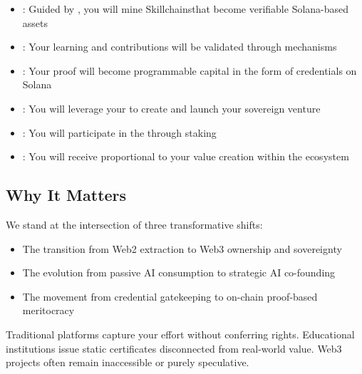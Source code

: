 \begin{itemize}
    \item {}: Guided by , you will mine Skillchains\texttrademark that become verifiable Solana-based assets
    
    \item {}: Your learning and contributions will be validated through  mechanisms
    
    \item {}: Your proof will become programmable capital in the form of  credentials on Solana
    
    \item {}: You will leverage your  to create and launch your sovereign venture
    
    \item {}: You will participate in the  through  staking
    
    \item {}: You will receive  proportional to your value creation within the ecosystem
\end{itemize}

\subsection*{Why It Matters}

We stand at the intersection of three transformative shifts:

\begin{itemize}
    \item The transition from Web2 extraction to Web3 ownership and sovereignty
    \item The evolution from passive AI consumption to strategic AI co-founding
    \item The movement from credential gatekeeping to on-chain proof-based meritocracy
\end{itemize}

Traditional platforms capture your effort without conferring rights. Educational institutions issue static certificates disconnected from real-world value. Web3 projects often remain inaccessible or purely speculative.

